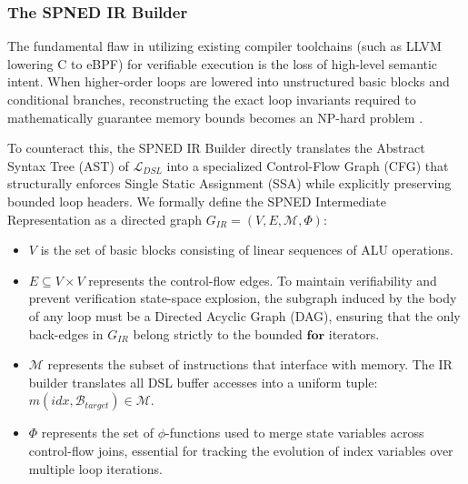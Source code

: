 \documentclass[onecolumn]{IEEEtran}
\numberwithin{equation}{section}
\theoremstyle{definition}
\theoremstyle{remark}
\begin{document}
\subsubsection{The SPNED IR Builder}

The fundamental flaw in utilizing existing compiler toolchains (such as LLVM lowering C to eBPF) for verifiable execution is the loss of high-level semantic intent. When higher-order loops are lowered into unstructured basic blocks and conditional branches, reconstructing the exact loop invariants required to mathematically guarantee memory bounds becomes an NP-hard problem \cite{vishwanathan2023verifying}. 

To counteract this, the SPNED IR Builder directly translates the Abstract Syntax Tree (AST) of $\mathcal{L}_{DSL}$ into a specialized Control-Flow Graph (CFG) that structurally enforces Single Static Assignment (SSA) while explicitly preserving bounded loop headers. We formally define the SPNED Intermediate Representation as a directed graph $G_{IR} = (V, E, \mathcal{M}, \Phi)$:

\begin{itemize}
    \item $V$ is the set of basic blocks consisting of linear sequences of ALU operations.
    \item $E \subseteq V \times V$ represents the control-flow edges. To maintain verifiability and prevent verification state-space explosion, the subgraph induced by the body of any loop must be a Directed Acyclic Graph (DAG), ensuring that the only back-edges in $G_{IR}$ belong strictly to the bounded $\mathbf{for}$ iterators.
    \item $\mathcal{M}$ represents the subset of instructions that interface with memory. The IR builder translates all DSL buffer accesses into a uniform tuple: $m(idx, \mathcal{B}_{target}) \in \mathcal{M}$.
    \item $\Phi$ represents the set of $\phi$-functions used to merge state variables across control-flow joins, essential for tracking the evolution of index variables over multiple loop iterations.
\end{itemize}
\end{document}
